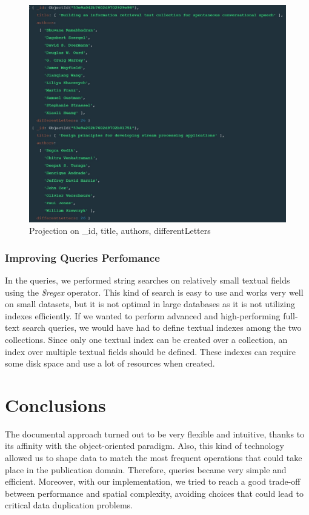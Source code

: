 \documentclass{Configuration_Files/PoliMi3i_thesis}
\begin{document}
\begin{figure}[H]
\centering
\includegraphics[width=1\textwidth]{query/mongo_q11.jpeg}
\caption{Projection on \_id, title, authors, differentLetters}
\label{fig:query11}
\end{figure}

\subsection{Improving Queries Perfomance}
In the queries, we performed string searches on relatively small textual fields using the \emph{\$regex} operator.
This kind of search is easy to use and works very well on small datasets, but it is not optimal in large databases as it is not utilizing indexes efficiently.
If we wanted to perform advanced and high-performing full-text search queries, we would have had to define textual indexes among the two collections.
Since only one textual index can be created over a collection, an index over multiple textual fields should be defined.
These indexes can require some disk space and use a lot of resources when created.


\chapter{Conclusions}
The documental approach turned out to be very flexible and intuitive, thanks to its affinity with the object-oriented paradigm.
Also, this kind of technology allowed us to shape data to match the most frequent operations that could take place in the
publication domain. Therefore, queries became very simple and efficient.\newline
Moreover, with our implementation, we tried to reach a good trade-off between performance and spatial complexity, avoiding
choices that could lead to critical data duplication problems.
\end{document}
